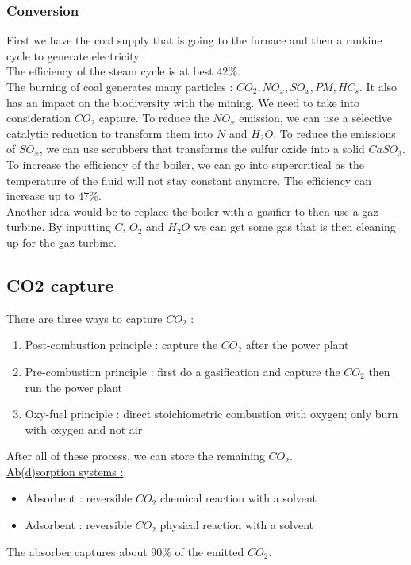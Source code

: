 \documentclass[../main.tex]{subfiles}
\begin{document}
\subsubsection{Conversion}
First we have the coal supply that is going to the furnace and then a rankine cycle to generate electricity.\\
The efficiency of the steam cycle is at best $42\%$.\\
The burning of coal generates many particles : $CO_2, NO_x, SO_x, PM, HC_s$. It also has an impact on the biodiversity with the mining. We need to take into consideration $CO_2$ capture. To reduce the $NO_x$ emission, we can use a selective catalytic reduction to transform them into $N$ and $H_2O$. To reduce the emissions of $SO_x$, we can use scrubbers that transforms the sulfur oxide into a solid $CaSO_3$.\\
To increase the efficiency of the boiler, we can go into supercritical as the temperature of the fluid will not stay constant anymore. The efficiency can increase up to $47\%$. \\

Another idea would be to replace the boiler with a gasifier to then use a gaz turbine. By inputting $C$, $O_2$ and $H_2O$ we can get some gas that is then cleaning up for the gaz turbine.

\subsection{CO2 capture}
There are three ways to capture $CO_2$ : \begin{enumerate}
    \item Post-combustion principle : capture the $CO_2$ after the power plant
    \item Pre-combustion principle : first do a gasification and capture the $CO_2$ then run the power plant
    \item Oxy-fuel principle : direct stoichiometric combustion with oxygen; only burn with oxygen and not air
\end{enumerate}
After all of these process, we can store the remaining $CO_2$.\\

\quad \underline{Ab(d)sorption systems :}\\
\begin{itemize}
    \item Absorbent : reversible $CO_2$ chemical reaction with a solvent
    \item Adsorbent : reversible $CO_2$ physical reaction with a solvent
\end{itemize}
The absorber captures about $90\%$ of the emitted $CO_2$.\\
\end{document}
